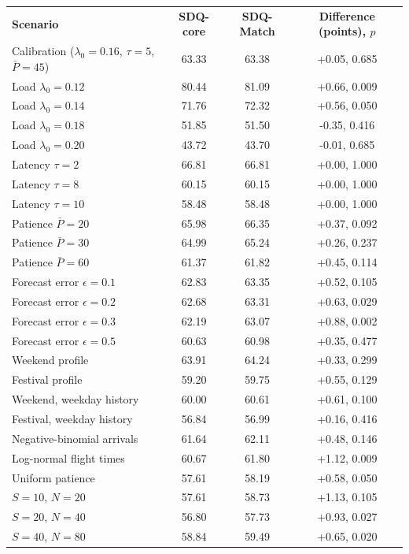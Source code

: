 \begin{tabular}{|l|c|c|c|}
\hline
\textbf{Scenario} & \textbf{SDQ-core} & \textbf{SDQ-Match} & \textbf{Difference (points), $p$} \\ \thickhline
Calibration ($\lambda_0=0.16$, $\tau=5$, $\bar P=45$) & 63.33 & 63.38 & +0.05, 0.685 \\ \hline
Load $\lambda_0=0.12$ & 80.44 & 81.09 & +0.66, 0.009 \\ \hline
Load $\lambda_0=0.14$ & 71.76 & 72.32 & +0.56, 0.050 \\ \hline
Load $\lambda_0=0.18$ & 51.85 & 51.50 & -0.35, 0.416 \\ \hline
Load $\lambda_0=0.20$ & 43.72 & 43.70 & -0.01, 0.685 \\ \hline
Latency $\tau=2$ & 66.81 & 66.81 & +0.00, 1.000 \\ \hline
Latency $\tau=8$ & 60.15 & 60.15 & +0.00, 1.000 \\ \hline
Latency $\tau=10$ & 58.48 & 58.48 & +0.00, 1.000 \\ \hline
Patience $\bar P=20$ & 65.98 & 66.35 & +0.37, 0.092 \\ \hline
Patience $\bar P=30$ & 64.99 & 65.24 & +0.26, 0.237 \\ \hline
Patience $\bar P=60$ & 61.37 & 61.82 & +0.45, 0.114 \\ \hline
Forecast error $\epsilon=0.1$ & 62.83 & 63.35 & +0.52, 0.105 \\ \hline
Forecast error $\epsilon=0.2$ & 62.68 & 63.31 & +0.63, 0.029 \\ \hline
Forecast error $\epsilon=0.3$ & 62.19 & 63.07 & +0.88, 0.002 \\ \hline
Forecast error $\epsilon=0.5$ & 60.63 & 60.98 & +0.35, 0.477 \\ \hline
Weekend profile & 63.91 & 64.24 & +0.33, 0.299 \\ \hline
Festival profile & 59.20 & 59.75 & +0.55, 0.129 \\ \hline
Weekend, weekday history & 60.00 & 60.61 & +0.61, 0.100 \\ \hline
Festival, weekday history & 56.84 & 56.99 & +0.16, 0.416 \\ \hline
Negative-binomial arrivals & 61.64 & 62.11 & +0.48, 0.146 \\ \hline
Log-normal flight times & 60.67 & 61.80 & +1.12, 0.009 \\ \hline
Uniform patience & 57.61 & 58.19 & +0.58, 0.050 \\ \hline
$S=10$, $N=20$ & 57.61 & 58.73 & +1.13, 0.105 \\ \hline
$S=20$, $N=40$ & 56.80 & 57.73 & +0.93, 0.027 \\ \hline
$S=40$, $N=80$ & 58.84 & 59.49 & +0.65, 0.020 \\ \hline
\end{tabular}